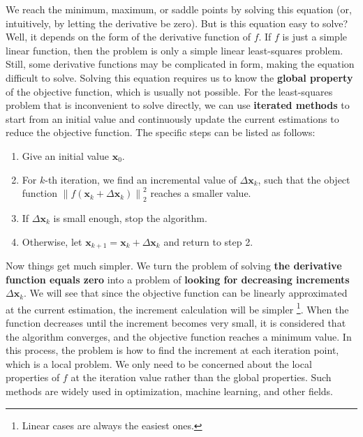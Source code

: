We reach the minimum, maximum, or saddle points by solving this equation (or, intuitively, by letting the derivative be zero). But is this equation easy to solve? Well, it depends on the form of the derivative function of $f$. If $f$ is just a simple linear function, then the problem is only a simple linear least-squares problem. Still, some derivative functions may be complicated in form, making the equation difficult to solve. Solving this equation requires us to know the \textbf{global property} of the objective function, which is usually not possible. For the least-squares problem that is inconvenient to solve directly, we can use \textbf{iterated methods} to start from an initial value and continuously update the current estimations to reduce the objective function. The specific steps can be listed as follows:

\begin{mdframed}  
    \begin{enumerate}
        \item Give an initial value $\mathbf{x}_0$.
        \item For $k$-th iteration, we find an incremental value of $\Delta \mathbf{x}_k$, such that the object function $\left\| {f\left( \mathbf{x}_k + \Delta \mathbf{x}_k \right)} \right \|^2_2$ reaches a smaller value.
        \item If $\Delta \mathbf{x}_k$ is small enough, stop the algorithm.
        \item Otherwise, let $\mathbf{x}_{k+1} = \mathbf{x}_k+\Delta \mathbf{x}_k$ and return to step 2.
    \end{enumerate}
\end{mdframed}

Now things get much simpler. We turn the problem of solving \textbf{the derivative function equals zero} into a problem of \textbf{looking for decreasing increments} $\Delta \mathbf{x}_k$. We will see that since the objective function can be linearly approximated at the current estimation, the increment calculation will be simpler \footnote{Linear cases are always the easiest ones.}. When the function decreases until the increment becomes very small, it is considered that the algorithm converges, and the objective function reaches a minimum value. In this process, the problem is how to find the increment at each iteration point, which is a local problem. We only need to be concerned about the local properties of $f$ at the iteration value rather than the global properties. Such methods are widely used in optimization, machine learning, and other fields.

